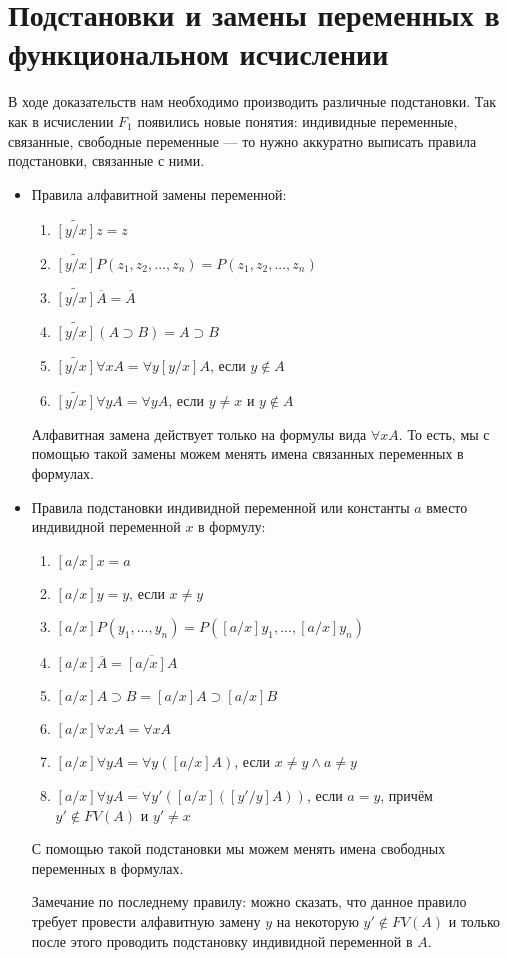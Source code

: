 \section{Подстановки и замены переменных в функциональном исчислении}

В ходе доказательств нам необходимо производить различные подстановки. Так как в исчислении $F_1$ появились новые понятия: индивидные переменные, связанные, свободные переменные --- то нужно аккуратно выписать правила подстановки, связанные с ними.

\begin{itemize}
    \item Правила алфавитной замены переменной:
    \begin{enumerate}
        \item $\widetilde{[y/x]}z = z$
        \item $\widetilde{[y/x]}P(z_1, z_2, ..., z_n)=P(z_1, z_2, ...,z_n)$
        \item $\widetilde{[y/x]}\overline{A} = \overline{A}$
        \item $\widetilde{[y/x]}(A \supset B)=A \supset B$
        \item $\widetilde{[y/x]}\forall x A = \forall y [y/x]A$, если $y \notin A$
        \item $\widetilde{[y/x]}\forall y A = \forall y A$, если $y \ne x$ и $y \notin A$
    \end{enumerate}
    Алфавитная замена действует только на формулы вида $\forall x A$. То есть, мы с помощью такой замены можем менять имена связанных переменных в формулах.

    \item Правила подстановки индивидной переменной или константы $a$ вместо индивидной переменной $x$ в формулу:
    \begin{enumerate}
        \item $[a/x]x=a$
        \item $[a/x]y=y$, если $x\ne y$
        \item $[a/x]P(y_1,...,y_n)=P([a/x]y_1,...,[a/x]y_n)$
        \item $[a/x]\overline{A}=\overline{[a/x]A}$
        \item $[a/x]A\supset B=[a/x]A \supset [a/x]B$
        \item $[a/x]\forall x A=\forall x A$
        \item $[a/x]\forall y A=\forall y ([a/x]A)$, если $x\ne y \land a\ne y$
        \item $[a/x]\forall y A=\forall y' ([a/x]([y'/y]A))$, если $a=y$, причём $y'\notin FV(A)$ и $y'\ne x$
    \end{enumerate}
    С помощью такой подстановки мы можем менять имена свободных переменных в формулах.

    Замечание по последнему правилу: можно сказать, что данное правило требует провести алфавитную замену $y$ на некоторую $y' \notin FV(A)$ и только после этого проводить подстановку индивидной переменной в $A$.
\end{itemize}

